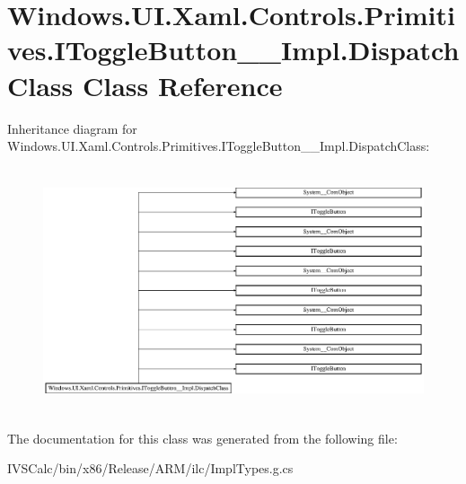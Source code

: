 \hypertarget{class_windows_1_1_u_i_1_1_xaml_1_1_controls_1_1_primitives_1_1_i_toggle_button_____impl_1_1_dispatch_class}{}\section{Windows.\+U\+I.\+Xaml.\+Controls.\+Primitives.\+I\+Toggle\+Button\+\_\+\+\_\+\+Impl.\+Dispatch\+Class Class Reference}
\label{class_windows_1_1_u_i_1_1_xaml_1_1_controls_1_1_primitives_1_1_i_toggle_button_____impl_1_1_dispatch_class}
Inheritance diagram for Windows.\+U\+I.\+Xaml.\+Controls.\+Primitives.\+I\+Toggle\+Button\+\_\+\+\_\+\+Impl.\+Dispatch\+Class\+:\begin{figure}[H]
\begin{center}
\leavevmode
\includegraphics[height=7.230048cm]{class_windows_1_1_u_i_1_1_xaml_1_1_controls_1_1_primitives_1_1_i_toggle_button_____impl_1_1_dispatch_class}
\end{center}
\end{figure}


The documentation for this class was generated from the following file\+:\begin{DoxyCompactItemize}
\item 
I\+V\+S\+Calc/bin/x86/\+Release/\+A\+R\+M/ilc/Impl\+Types.\+g.\+cs\end{DoxyCompactItemize}
